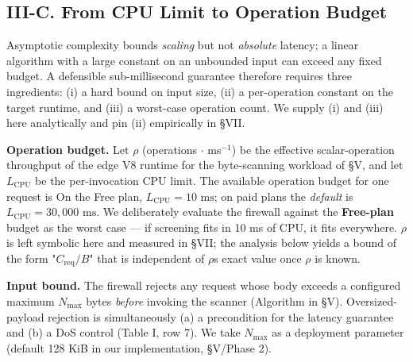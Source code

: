 \subsection{III-C. From CPU Limit to Operation
Budget}\label{iii-c-from-cpu-limit-to-operation-budget}

Asymptotic complexity bounds \emph{scaling} but not \emph{absolute}
latency; a linear algorithm with a large constant on an unbounded input
can exceed any fixed budget. A defensible sub-millisecond guarantee
therefore requires three ingredients: (i) a hard bound on input size,
(ii) a per-operation constant on the target runtime, and (iii) a
worst-case operation count. We supply (i) and (iii) here analytically
and pin (ii) empirically in §VII.

\textbf{Operation budget.} Let \(\rho\) (operations $\cdot$ ms\(^{-1}\)) be
the effective scalar-operation throughput of the edge V8 runtime for the
byte-scanning workload of §V, and let \(L_{\text{CPU}}\) be the
per-invocation CPU limit. The available operation budget for one request
is  On the Free plan,
\(L_{\text{CPU}} = 10\text{ ms}\); on paid plans the \emph{default} is
\(L_{\text{CPU}} =
30{,}000\text{ ms}\). We deliberately evaluate the firewall against the
\textbf{Free-plan} budget as the worst case --- if screening fits in 10
ms of CPU, it fits everywhere. \(\rho\) is left symbolic here and
measured in §VII; the analysis below yields a bound of the form
"\(C_{\text{req}}/B\)" that is independent of \(\rho\)\textquotesingle s
exact value once \(\rho\) is known.

\textbf{Input bound.} The firewall rejects any request whose body
exceeds a configured maximum \(N_{\max}\) bytes \emph{before} invoking
the scanner (Algorithm in §V). Oversized-payload rejection is
simultaneously (a) a precondition for the latency guarantee and (b) a
DoS control (Table I, row 7). We take \(N_{\max}\) as a deployment
parameter (default 128 KiB in our implementation, §V/Phase 2).

